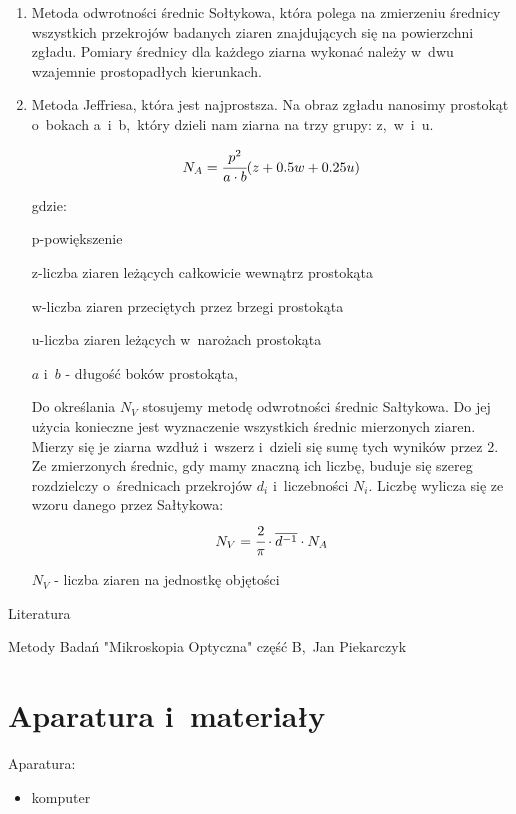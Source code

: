 \documentclass[a4paper,12pt]{article}
\begin{document}
\begin{enumerate}
    \item Metoda odwrotności średnic Sołtykowa, która polega na zmierzeniu średnicy wszystkich przekrojów badanych ziaren znajdujących się na powierzchni zgładu. Pomiary średnicy dla każdego ziarna wykonać należy  w~dwu wzajemnie prostopadłych kierunkach.
    \newpage
    \item Metoda Jeffriesa, która jest najprostsza. Na obraz zgładu nanosimy prostokąt o~bokach a~i~b,~który dzieli nam ziarna na trzy grupy: z,~w~i~u.{\color{blue} 
    
    $$N_A=\cfrac{p^2}{a\cdot b}(z+0.5w+0.25u)$$
    
    gdzie: 
    
    p-powiększenie
    
    z-liczba ziaren leżących całkowicie wewnątrz prostokąta
    
    w-liczba ziaren przeciętych przez brzegi prostokąta 
    
    u-liczba ziaren leżących w~narożach prostokąta
    
    $a$ i~$b$ - długość boków prostokąta,
    
    } 
    
   {\color{blue} Do określania $N_V$ stosujemy metodę odwrotności średnic Sałtykowa. Do jej użycia konieczne jest wyznaczenie wszystkich średnic mierzonych ziaren. Mierzy się je ziarna wzdłuż i~wszerz i~dzieli się sumę tych wyników przez 2. Ze zmierzonych średnic, gdy mamy znaczną ich liczbę, buduje się szereg rozdzielczy o~średnicach przekrojów $d_i$ i~liczebności $N_i$. Liczbę wylicza się ze wzoru danego przez Sałtykowa: 
   $$N_V=\cfrac{2}{\pi}\cdot \overline{d^{-1}} \cdot N_A$$
   
   $N_V$ - liczba ziaren na jednostkę objętości
   }
   \newline
   
   
\end{enumerate}


Literatura

Metody Badań "Mikroskopia Optyczna" część B,~Jan Piekarczyk

\newpage

\section{Aparatura i~materiały}

Aparatura:
\begin{itemize}
    \item komputer
\end{itemize}
\end{document}
